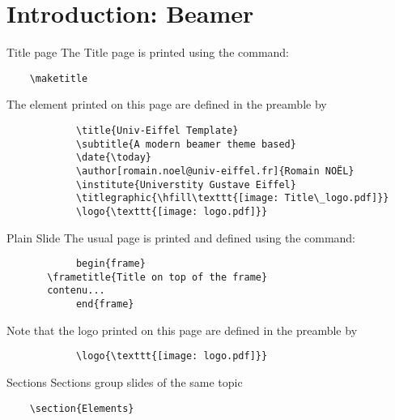\documentclass[aspectratio=169]{beamer}
\begin{document}


\section{Introduction: Beamer}

	\begin{frame}[fragile]{Title page}
		The Title page is printed using the command:			
		\begin{verbatim}    \maketitle\end{verbatim}
		
		The element printed on this page are defined in the preamble by
		\begin{verbatim}
			\title{Univ-Eiffel Template}
			\subtitle{A modern beamer theme based}
			\date{\today}
			\author[romain.noel@univ-eiffel.fr]{Romain NOËL}
			\institute{Universtity Gustave Eiffel}
			\titlegraphic{\hfill\texttt{[image: Title\_logo.pdf]}}
			\logo{\texttt{[image: logo.pdf]}}
		\end{verbatim}
	\end{frame}
	
	\begin{frame}[fragile]{Plain Slide}
		The usual page is printed and defined using the command:			
		\begin{verbatim}
			begin{frame}
	   \frametitle{Title on top of the frame}
	   contenu...
			end{frame}
		\end{verbatim}
		
		Note that the logo printed on this page are defined in the preamble by
		\begin{verbatim}
			\logo{\texttt{[image: logo.pdf]}}
		\end{verbatim}
	\end{frame}

	\begin{frame}[fragile]{Sections}
		Sections group slides of the same topic
		
		\begin{verbatim}    \section{Elements}\end{verbatim}
	\end{frame}
\end{document}

